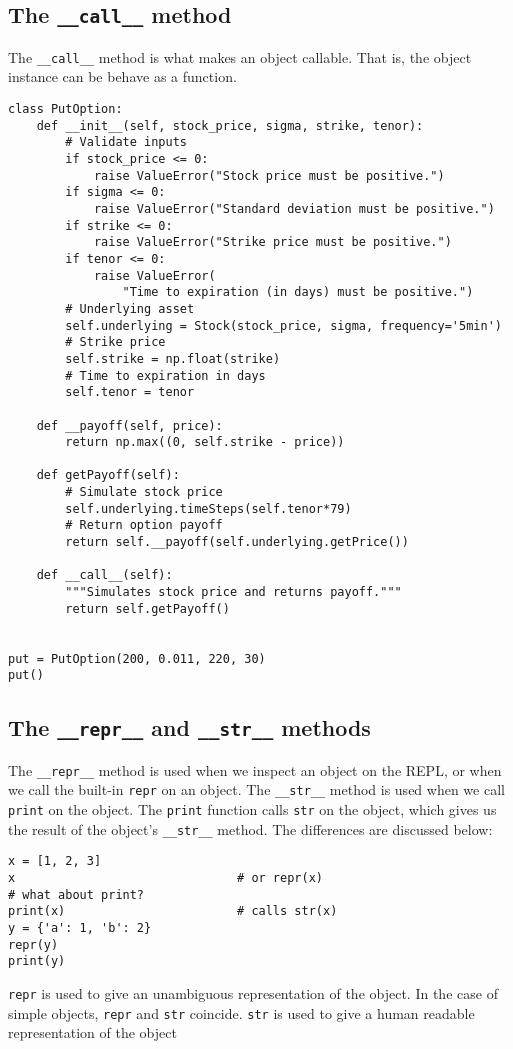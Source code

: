 \documentclass[12pt, a4paper]{article}
\begin{document}
\subsection{The \texttt{\_\_call\_\_} method}
\label{sec:org1af2755}
The \texttt{\_\_call\_\_} method is what makes an object callable.
That is, the object instance can be behave as a function.
\lstset{language=jupyter-python,label= ,caption= ,captionpos=b,numbers=none}
\begin{lstlisting}
class PutOption:
    def __init__(self, stock_price, sigma, strike, tenor):
        # Validate inputs
        if stock_price <= 0:
            raise ValueError("Stock price must be positive.")
        if sigma <= 0:
            raise ValueError("Standard deviation must be positive.")
        if strike <= 0:
            raise ValueError("Strike price must be positive.")
        if tenor <= 0:
            raise ValueError(
                "Time to expiration (in days) must be positive.")
        # Underlying asset
        self.underlying = Stock(stock_price, sigma, frequency='5min')
        # Strike price
        self.strike = np.float(strike)
        # Time to expiration in days
        self.tenor = tenor

    def __payoff(self, price):
        return np.max((0, self.strike - price))

    def getPayoff(self):
        # Simulate stock price
        self.underlying.timeSteps(self.tenor*79)
        # Return option payoff
        return self.__payoff(self.underlying.getPrice())

    def __call__(self):
        """Simulates stock price and returns payoff."""
        return self.getPayoff()


put = PutOption(200, 0.011, 220, 30)
put()
\end{lstlisting}
\subsection{The \texttt{\_\_repr\_\_} and \texttt{\_\_str\_\_} methods}
\label{sec:orgcfc980a}
The \texttt{\_\_repr\_\_} method is used when we inspect an object on the REPL, or when we call the built-in \texttt{repr} on an object.
The \texttt{\_\_str\_\_} method is used when we call \texttt{print} on the object. The \texttt{print} function calls \texttt{str} on the object, which gives us the result of the object's \texttt{\_\_str\_\_} method.
The differences are discussed below:
\lstset{language=jupyter-python,label= ,caption= ,captionpos=b,numbers=none}
\begin{lstlisting}
x = [1, 2, 3]
x                               # or repr(x)
# what about print?
print(x)                        # calls str(x)
y = {'a': 1, 'b': 2}
repr(y)
print(y)
\end{lstlisting}
\texttt{repr} is used to give an unambiguous representation of the object.
In the case of simple objects, \texttt{repr} and \texttt{str} coincide.
\texttt{str} is used to give a human readable representation of the object
\end{document}
